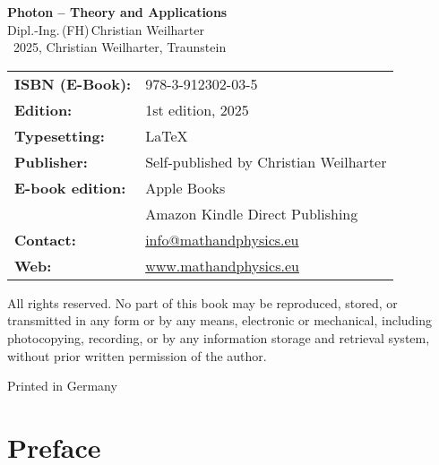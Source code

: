 \cleardoublepage
\thispagestyle{empty}
\begin{center}
	
	{\Large\textbf{Photon – Theory and Applications}}\\[1.2em]
	{\large Dipl.-Ing.\,(FH)\,Christian Weilharter}\\[1.2em]
	\textcopyright~2025, Christian Weilharter, Traunstein\\[2em]
\end{center}

\begin{flushleft}
	\begin{tabular}{@{}l l}
	
		\textbf{ISBN (E-Book):} & 978-3-912302-03-5 \\[0.5em]
		\textbf{Edition:} & 1st edition, 2025 \\[0.5em]
		\textbf{Typesetting:} & \LaTeX \\[0.5em]
		\textbf{Publisher:} & Self-published by Christian Weilharter \\[0.5em]


	
		\textbf{E-book edition:} & Apple Books \\[0.5em]
		& Amazon Kindle Direct Publishing \\[0.5em]
		\textbf{Contact:} & \href{mailto:info@mathandphysics.de}{info@mathandphysics.eu} \\[0.5em]
		\textbf{Web:} & \href{https://www.mathandphysics.de}{www.mathandphysics.eu} \\

	\end{tabular}
\end{flushleft}

\vspace{2em}
\noindent
All rights reserved. No part of this book may be reproduced, stored, or transmitted
in any form or by any means, electronic or mechanical, including photocopying,
recording, or by any information storage and retrieval system, without prior written
permission of the author.

\begin{center}\small Printed in Germany\end{center}

\cleardoublepage


\chapter*{Preface}



